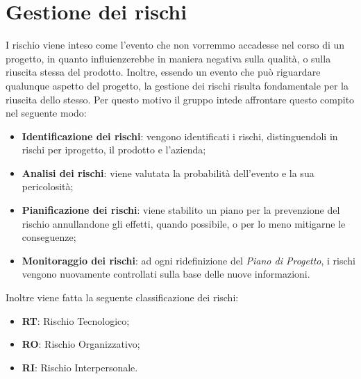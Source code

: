 \section{Gestione dei rischi}
I rischio viene inteso come l'evento che non vorremmo accadesse nel corso di un progetto, in quanto influienzerebbe in maniera negativa sulla qualità, o sulla riuscita stessa del prodotto. Inoltre, essendo un evento che può riguardare qualunque aspetto del progetto, la gestione dei rischi risulta fondamentale per la riuscita dello stesso. Per questo motivo il gruppo intede affrontare questo compito nel seguente modo:\\
\begin{itemize}
\item \textbf{Identificazione dei rischi}: vengono identificati i rischi, distinguendoli in rischi per iprogetto, il prodotto e l'azienda;
\item \textbf{Analisi dei rischi}: viene valutata la probabilità dell'evento e la sua pericolosità;
\item \textbf{Pianificazione dei rischi}: viene stabilito un piano per la prevenzione del rischio annullandone gli effetti, quando possibile, o per lo meno mitigarne le conseguenze;
\item \textbf{Monitoraggio dei rischi}: ad ogni ridefinizione del \textit{Piano di Progetto}, i rischi vengono nuovamente controllati sulla base delle nuove informazioni.
\end{itemize}
Inoltre viene fatta la seguente classificazione dei rischi:
\begin{itemize}
\item \textbf{RT}: Rischio Tecnologico;
\item \textbf{RO}: Rischio Organizzativo;
\item \textbf{RI}: Rischio Interpersonale.
\end{itemize}

